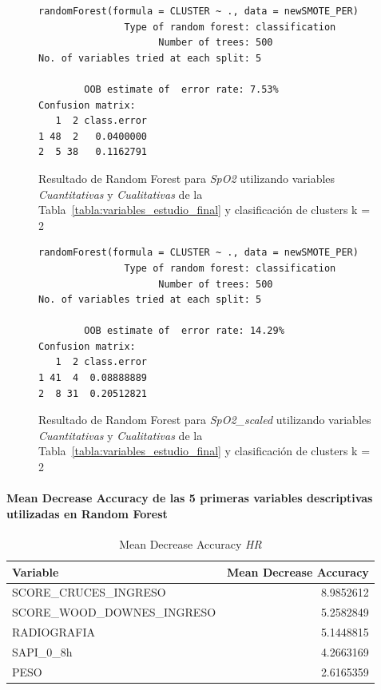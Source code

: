 \begin{figure}[H]
    \centering
    \begin{lstlisting}[frame=single, basicstyle=\small\ttfamily]
        randomForest(formula = CLUSTER ~ ., data = newSMOTE_PER) 
               Type of random forest: classification
                     Number of trees: 500
No. of variables tried at each split: 5

        OOB estimate of  error rate: 7.53%
Confusion matrix:
   1  2 class.error
1 48  2   0.0400000
2  5 38   0.1162791
    \end{lstlisting}
    \caption{Resultado de Random Forest para \textit{SpO2} utilizando variables \textit{Cuantitativas} y \textit{Cualitativas} de la Tabla~\ref{tabla:variables_estudio_final} y clasificación de clusters k = 2}\label{fig:random_forest_per_result_4}
\end{figure}
\begin{figure}[H]
    \centering
    \begin{lstlisting}[frame=single, basicstyle=\small\ttfamily]
        randomForest(formula = CLUSTER ~ ., data = newSMOTE_PER) 
               Type of random forest: classification
                     Number of trees: 500
No. of variables tried at each split: 5

        OOB estimate of  error rate: 14.29%
Confusion matrix:
   1  2 class.error
1 41  4  0.08888889
2  8 31  0.20512821
    \end{lstlisting}
    \caption{Resultado de Random Forest para \textit{SpO2\_scaled} utilizando variables \textit{Cuantitativas} y \textit{Cualitativas} de la Tabla~\ref{tabla:variables_estudio_final} y clasificación de clusters k = 2}
    \label{fig:random_forest_per_result_5}
\end{figure}

\paragraph{Mean Decrease Accuracy de las 5 primeras variables descriptivas utilizadas en Random Forest}

\begin{table}[H]
    \centering
    \begin{tabular}{lr}
        \toprule
        \textbf{Variable} & \textbf{Mean Decrease Accuracy} \\
        \midrule
        SCORE\_CRUCES\_INGRESO & 8.9852612 \\
        SCORE\_WOOD\_DOWNES\_INGRESO & 5.2582849 \\
        RADIOGRAFIA & 5.1448815 \\
        SAPI\_0\_8h & 4.2663169 \\
        PESO & 2.6165359 \\
        \bottomrule
    \end{tabular}
    \caption{Mean Decrease Accuracy \textit{HR}}
\end{table}

